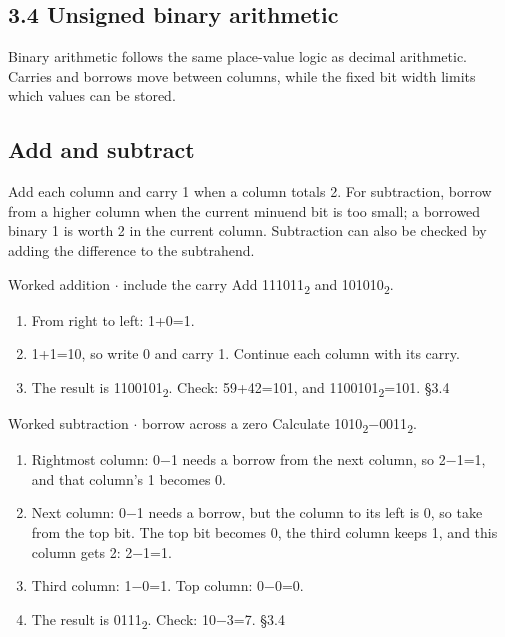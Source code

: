\documentclass[11pt]{article}
\begin{document}
\begin{keepsection}
\section{3.4 Unsigned binary arithmetic}

Binary arithmetic follows the same place-value logic as decimal arithmetic. Carries and borrows move between columns, while the fixed bit width limits which values can be stored.

\begin{keepsection}
\subsection{Add and subtract}

Add each column and carry 1 when a column totals 2. For subtraction, borrow from a higher column when the current minuend bit is too small; a borrowed binary 1 is worth 2 in the current column. Subtraction can also be checked by adding the difference to the subtrahend.

\begin{workedbox}{Worked addition \ensuremath{\cdot} include the carry}
Add 111011\textsubscript{2} and 101010\textsubscript{2}.

\begin{enumerate}
\item From right to left: 1+0=1.
\item 1+1=10, so write 0 and carry 1. Continue each column with its carry.
\item The result is 1100101\textsubscript{2}. Check: 59+42=101, and 1100101\textsubscript{2}=101. \hfill{\small\color{FAUblue}§3.4}
\end{enumerate}
\end{workedbox}

\begin{workedbox}{Worked subtraction \ensuremath{\cdot} borrow across a zero}
Calculate 1010\textsubscript{2}\ensuremath{-}0011\textsubscript{2}.

\begin{enumerate}
\item Rightmost column: 0\ensuremath{-}1 needs a borrow from the next column, so 2\ensuremath{-}1=1, and that column’s 1 becomes 0.
\item Next column: 0\ensuremath{-}1 needs a borrow, but the column to its left is 0, so take from the top bit. The top bit becomes 0, the third column keeps 1, and this column gets 2: 2\ensuremath{-}1=1.
\item Third column: 1\ensuremath{-}0=1. Top column: 0\ensuremath{-}0=0.
\item The result is 0111\textsubscript{2}. Check: 10\ensuremath{-}3=7. \hfill{\small\color{FAUblue}§3.4}
\end{enumerate}
\end{workedbox}
\end{keepsection}


\end{keepsection}
\end{document}
